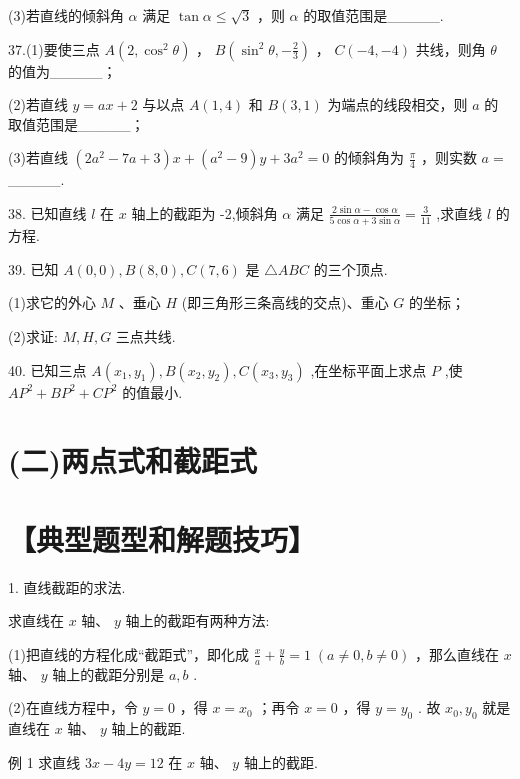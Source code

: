 \documentclass[10pt]{article}
\begin{document}
(3)若直线的倾斜角 \(\alpha\) 满足 \(\tan \alpha  \leq  \sqrt{3}\) ，则 \(\alpha\) 的取值范围是\_\_\_\_\_.

37.(1)要使三点 \(A\left( {2,{\cos }^{2}\theta }\right)\) ， \(B\left( {{\sin }^{2}\theta , - \frac{2}{3}}\right)\) ， \(C\left( {-4, - 4}\right)\) 共线，则角 \(\theta\) 的值为\_\_\_\_\_；

(2)若直线 \(y = {ax} + 2\) 与以点 \(A\left( {1,4}\right)\) 和 \(B\left( {3,1}\right)\) 为端点的线段相交，则 \(a\) 的取值范围是\_\_\_\_\_；

(3)若直线 \(\left( {2{a}^{2} - {7a} + 3}\right) x + \left( {{a}^{2} - 9}\right) y + 3{a}^{2} = 0\) 的倾斜角为 \(\frac{\pi }{4}\) ，则实数 \(a =\) \_\_\_\_\_.

38. 已知直线 \(l\) 在 \(x\) 轴上的截距为 -2,倾斜角 \(\alpha\) 满足 \(\frac{2\sin \alpha  - \cos \alpha }{5\cos \alpha  + 3\sin \alpha } = \frac{3}{11}\) ,求直线 \(l\) 的方程.

39. 已知 \(A\left( {0,0}\right) ,B\left( {8,0}\right) ,C\left( {7,6}\right)\) 是 \(\bigtriangleup {ABC}\) 的三个顶点.

(1)求它的外心 \(M\) 、垂心 \(H\) (即三角形三条高线的交点)、重心 \(G\) 的坐标；

(2)求证: \(M,H,G\) 三点共线.

40. 已知三点 \(A\left( {{x}_{1},{y}_{1}}\right) ,B\left( {{x}_{2},{y}_{2}}\right) ,C\left( {{x}_{3},{y}_{3}}\right)\) ,在坐标平面上求点 \(P\) ,使 \(A{P}^{2} + B{P}^{2} + C{P}^{2}\) 的值最小.

\section*{(二)两点式和截距式}

\section*{【典型题型和解题技巧】}

1. 直线截距的求法.

求直线在 \(x\) 轴、 \(y\) 轴上的截距有两种方法:

(1)把直线的方程化成“截距式”，即化成 \(\frac{x}{a} + \frac{y}{b} = 1\;\left( {a \neq  0,b \neq  0}\right)\) ，那么直线在 \(x\) 轴、 \(y\) 轴上的截距分别是 \(a,b\) .

(2)在直线方程中，令 \(y = 0\) ，得 \(x = {x}_{0}\) ；再令 \(x = 0\) ，得 \(y = {y}_{0}\) . 故 \({x}_{0},{y}_{0}\) 就是直线在 \(x\) 轴、 \(y\) 轴上的截距.

例 1 求直线 \({3x} - {4y} = {12}\) 在 \(x\) 轴、 \(y\) 轴上的截距.
\end{document}
